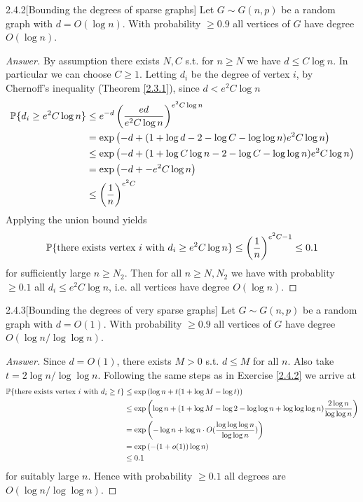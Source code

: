 {\begin{ex}{2.4.2}[Bounding the degrees of sparse graphs]\label{2.4.2} 
Let $G \sim G(n,p)$ be a random graph with $d = O(\log n)$. With probability $\geq 0.9$ all vertices of $G$ have degree $O(\log n)$.
\end{ex}
\begin{proof}[Answer]
By assumption there exists $N, C$ s.t. for $n\geq N$ we have $d \leq C \log n$. In particular we can choose $C \geq 1$. Letting $d_i$ be the degree of vertex $i$, by Chernoff's inequality (Theorem \ref{2.3.1}), since $d < e^2C\log n$
\begin{align*}
    \mathbb{P} \{ d_i \geq e^2C\log n\} &\leq e^{-d}\left(\frac  {ed} {e^2C\log n}\right)^{e^2C\log n} \\
    &= \exp \left( -d + (1 + \log d -2 - \log C - \log\log n)e^2C\log n\right) \\
    &\leq \exp \left( -d + (1 + \log C\log n -2 - \log C - \log\log n)e^2C\log n\right) \\
    &= \exp \left( -d + -e^2C\log n\right) \\
    &\leq \left(\frac 1 n\right)^{e^2 C}
\end{align*}
Applying the union bound yields
\begin{align*}
    \mathbb{P} \{ \text{there exists vertex $i$ with } d_i \geq e^2C\log n\} \leq \left(\frac 1 n\right)^{e^2 C -1} \leq 0.1
\end{align*}
for sufficiently large $n \geq N_2$. Then for all $n \geq N, N_2$ we have with probablity $\geq 0.1$ all $d_i \leq e^2C\log n$, i.e. all vertices have degree $O(\log n)$.
\end{proof}

\begin{ex}{2.4.3}[Bounding the degrees of very sparse graphs]\label{2.4.3} 
Let $G \sim G(n,p)$ be a random graph with $d = O(1)$. With probability $\geq 0.9$ all vertices of $G$ have degree $O(\log n/\log\log n)$.
\end{ex}
\begin{proof}[Answer]
Since $d = O(1)$, there exists $M>0$ s.t. $d \leq M$ for all $n$. Also take $t = 2 \log n / \log\log n$.
Following the same steps as in Exercise \ref{2.4.2} we arrive at
\begin{align*}
\mathbb{P} \{ \text{there exists vertex $i$ with } d_i \geq t \} &\leq \exp \left(\log n + t(1 + \log M - \log t) \right) \\
&\leq \exp \left(\log n + (1+ \log M -\log 2 - \log\log n + \log\log\log n)\frac {2\log n} {\log\log n}\right) \\
&= \exp \left( - \log n + \log n \cdot O(\frac{\log\log\log n} {\log \log n})\right) \\
&= \exp \left(-(1 + o(1))\log n\right) \\
&\leq 0.1
\end{align*}
for suitably large $n$. Hence with probability $\geq 0.1$ all degrees are $O(\log n / \log\log n)$.
\end{proof}

}
